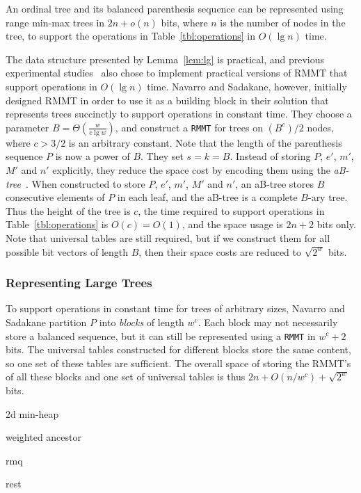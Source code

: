 \begin{lemma}\label{lem:lg}
An ordinal tree and its balanced parenthesis sequence can be represented using range min-max trees in $2n + o(n)$ bits, where $n$ is the number of nodes in the tree, to support the operations in Table~\ref{tbl:operations} in $O(\lg n)$ time. 
\end{lemma}

The data structure presented by Lemma~\ref{lem:lg} is practical, and previous experimental studies~\cite{ACNSalenex10} also chose to implement practical versions of RMMT that support operations in $O(\lg n)$ time. 
Navarro and Sadakane, however, initially designed RMMT in order to use it as a building block in their solution that represents trees succinctly to support operations in constant time. 
They choose a parameter $B = \Theta(\frac{w}{c\lg w})$, and construct a {\tt RMMT} for trees on $(B^c)/2$ nodes, where $c > 3/2$ is an arbitrary constant. 
Note that the length of the parenthesis sequence $P$ is now a power of $B$. 
They set $s = k = B$. 
Instead of storing $P$, $e'$, $m'$, $M'$ and $n'$ explicitly, they reduce the space cost by encoding them using the {\em aB-tree}~\cite{Patrascu:2008:SUC:1470582.1470670}. 
When constructed to store $P$, $e'$, $m'$, $M'$ and $n'$, an aB-tree stores $B$ consecutive elements of $P$ in each leaf, and the aB-tree is a complete $B$-ary tree. 
Thus the height of the tree is $c$, the time required to support operations in Table~\ref{tbl:operations} is $O(c) = O(1)$, and the space usage is $2n+2$ bits only. 
Note that universal tables are still required, but if we construct them for all possible bit vectors of length $B$, then their space costs are reduced to $\sqrt{2^w}$ bits. 

\subsubsection{Representing Large Trees}

To support operations in constant time for trees of arbitrary sizes, Navarro and Sadakane partition $P$ into {\em blocks} of length $w^c$. 
Each block may not necessarily store a balanced sequence, but it can still be represented using a {\tt RMMT} in $w^c + 2$ bits.  
The universal tables constructed for different blocks store the same content, so one set of these tables are sufficient. 
The overall space of storing the RMMT's of all these blocks and one set of universal tables is thus $2n + O(n/w^c) + \sqrt{2^w}$ bits. 

2d min-heap

weighted ancestor

rmq

rest